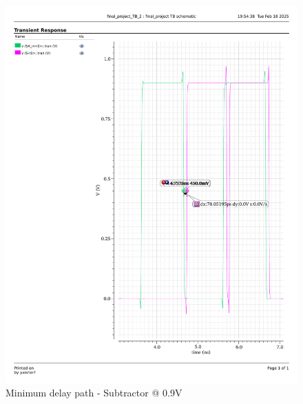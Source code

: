 \documentclass[a4paper,12pt]{article}
\begin{document}
\begin{figure}[H]
    \centering
    \begin{minipage}{0.49\textwidth}
        \centering
        \includegraphics[width=\textwidth]{delay/CP_min_sub_0.9.pdf}
        \caption{Minimum delay path - Subtractor @ 0.9V}
    \end{minipage}
    \hfill
    \begin{minipage}{0.49\textwidth}
        \centering

\end{minipage}
\end{figure}
\end{document}
